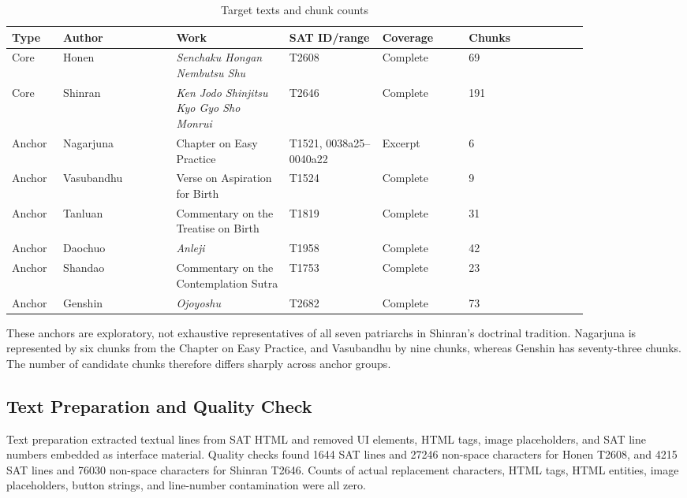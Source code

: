 \documentclass[uplatex,dvipdfmx,11pt,a4paper]{jsarticle}
\begin{document}
\begin{table}[H]
\centering
\footnotesize
\setlength{\tabcolsep}{2pt}
\caption{Target texts and chunk counts}
\label{tab:corpus}
\begin{tabular}{@{}p{0.06\linewidth}p{0.17\linewidth}p{0.17\linewidth}p{0.14\linewidth}p{0.13\linewidth}p{0.18\linewidth}@{}}
\toprule
Type & Author & Work & SAT ID/range & Coverage & Chunks \\
\midrule
Core & Honen & \emph{Senchaku Hongan Nembutsu Shu} & T2608 & Complete & 69 \\
Core & Shinran & \emph{Ken Jodo Shinjitsu Kyo Gyo Sho Monrui} & T2646 & Complete & 191 \\
Anchor & Nagarjuna & Chapter on Easy Practice & T1521, 0038a25--0040a22 & Excerpt & 6 \\
Anchor & Vasubandhu & Verse on Aspiration for Birth & T1524 & Complete & 9 \\
Anchor & Tanluan & Commentary on the Treatise on Birth & T1819 & Complete & 31 \\
Anchor & Daochuo & \emph{Anleji} & T1958 & Complete & 42 \\
Anchor & Shandao & Commentary on the Contemplation Sutra & T1753 & Complete & 23 \\
Anchor & Genshin & \emph{Ojoyoshu} & T2682 & Complete & 73 \\
\bottomrule
\end{tabular}
\end{table}

These anchors are exploratory, not exhaustive representatives of all seven patriarchs in Shinran's doctrinal tradition. Nagarjuna is represented by six chunks from the Chapter on Easy Practice, and Vasubandhu by nine chunks, whereas Genshin has seventy-three chunks. The number of candidate chunks therefore differs sharply across anchor groups.

\subsection{Text Preparation and Quality Check}

Text preparation extracted textual lines from SAT HTML and removed UI elements, HTML tags, image placeholders, and SAT line numbers embedded as interface material. Quality checks found 1644 SAT lines and 27246 non-space characters for Honen T2608, and 4215 SAT lines and 76030 non-space characters for Shinran T2646. Counts of actual replacement characters, HTML tags, HTML entities, image placeholders, button strings, and line-number contamination were all zero.
\end{document}
